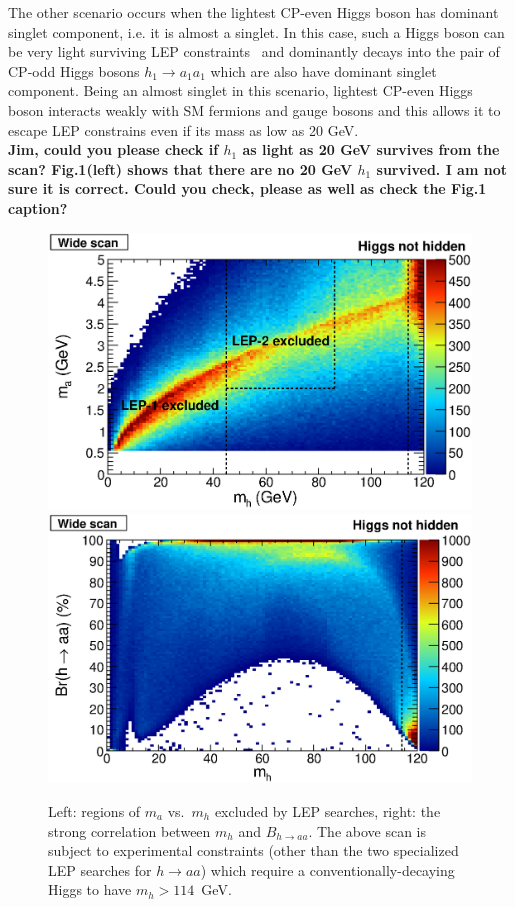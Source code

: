 \documentclass[aps,12pt,superscriptaddress,nofootinbib,floatfix,showpacs]{revtex4}
\begin{document}
The other scenario
occurs when the lightest CP-even Higgs boson
has dominant singlet component, i.e. it is almost a singlet.
In this case, such a Higgs boson can be very light surviving
LEP constraints~\cite{lep1exclusion,lep2exclusion} 
and dominantly decays into the pair of CP-odd Higgs bosons $h_1\to a_1 a_1$
which are also have dominant singlet component.
Being an almost singlet in this scenario, lightest CP-even Higgs boson
interacts weakly with SM fermions and gauge bosons
and this allows it to escape LEP constrains even if its mass 
as low as 20 GeV. 
\\
{\bf Jim, could you please check if 
$h_1$ as light as 20 GeV survives from the scan?
Fig.1(left) shows that there are no 20 GeV $h_1$ survived.
I am not sure it is correct. Could you check, please
as well as check the Fig.1 caption?}
%


\begin{figure}[htb]
\begin{center}
\includegraphics[width=0.5\linewidth]{plots/mass_exclusion.eps}%
\includegraphics[width=0.5\linewidth]{plots/mh_brhaa.eps}
\caption{Left: regions of $m_a$ vs.\ $m_h$ excluded by LEP searches,
  right: the strong correlation between $m_h$ and $B_{h \to aa}$.  
  The above scan is subject to experimental constraints (other
  than the two specialized LEP searches for $h\to aa$) which require a
  conventionally-decaying Higgs to have $m_h >
  114$~GeV. \label{mass_exclusion}}
\end{center}
\end{figure}
\end{document}
